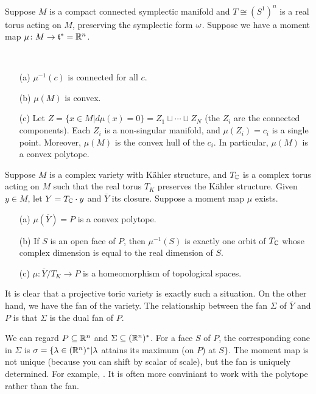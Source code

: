 Suppose $M$ is a compact connected symplectic manifold and $T\cong (S^1)^n$ is a real torus acting on $M$, preserving the symplectic form $\omega$. Suppose we have a moment map $\mu\colon M\to \mathfrak{t}^*=\mathbb{R}^n$.
\begin{theorem}\label{lec30:thm1}
 {\ }
 \begin{enumerate}
  \item[(a)] $\mu^{-1}(c)$ is connected for all $c$.
  \item[(b)] $\mu(M)$ is convex.
  \item[(c)] Let $Z=\{x\in M|d\mu(x)=0\}=Z_1\sqcup\cdots \sqcup Z_N$ (the $Z_i$ are the connected components). Each $Z_i$ is a non-singular manifold, and $\mu(Z_i)=c_i$ is a single point. Moreover, $\mu(M)$ is the convex hull of the $c_i$. In particular, $\mu(M)$ is a convex polytope.
 \end{enumerate}
\end{theorem}
\begin{theorem}\label{lec30:thm2}
 Suppose $M$ is a complex variety with K\"ahler structure, and $T_{\mathbb{C}}$ is a complex torus acting on $M$ such that the real torus $T_K$ preserves the K\"ahler structure. Given $y\in M$, let $Y=T_{\mathbb{C}}\cdot y$ and $\overline Y$ its closure. Suppose a moment map $\mu$ exists.
 \begin{enumerate}
  \item[(a)] $\mu(\overline Y)=P$ is a convex polytope.
  \item[(b)] If $S$ is an open face of $P$, then $\mu^{-1}(S)$ is exactly one orbit of $T_{\mathbb{C}}$ whose complex dimension is equal to the real dimension of $S$.
  \item[(c)] $\mu\colon \overline Y/T_K\to P$ is a homeomorphism of topological spaces.
 \end{enumerate}
\end{theorem}
It is clear that a projective toric variety is exactly such a situation. On the other hand, we have the fan of the variety. The relationship between the fan $\Sigma$ of $\overline Y$ and $P$ is that $\Sigma$ is the dual fan of $P$.

We can regard $P\subseteq \mathbb{R}^n$ and $\Sigma\subseteq (\mathbb{R}^n)^*$. For a face $S$ of $P$, the corresponding cone in $\Sigma$ is $\sigma=\{\lambda\in (\mathbb{R}^n)^*|\lambda$ attains its maximum (on $P$) at $S\}$. The moment map is not unique (because you can shift by scalar of scale), but the fan is uniquely determined. For example, . It is often more conviniant to work with the polytope rather than the fan.

